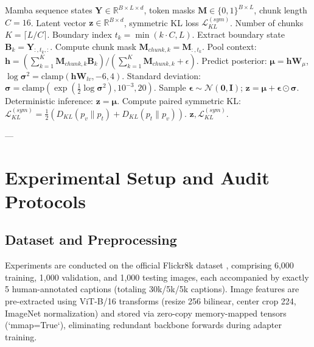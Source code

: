 \documentclass[journal]{IEEEtran}
\begin{document}
\begin{algorithm}[t]
\caption{Boundary-State Extraction and HVSC Compression}
\label{alg:hvsc_compression}
\begin{algorithmic}[1]
\REQUIRE Mamba sequence states $\mathbf{Y} \in \mathbb{R}^{B \times L \times d}$, token masks $\mathbf{M} \in \{0, 1\}^{B \times L}$, chunk length $C=16$.
\ENSURE Latent vector $\mathbf{z} \in \mathbb{R}^{B \times d}$, symmetric KL loss $\mathcal{L}_{KL}^{(sym)}$.
\STATE Number of chunks $K = \lceil L / C \rceil$.
    \STATE Boundary index $t_k = \min(k \cdot C, L)$.
    \STATE Extract boundary state $\mathbf{B}_k = \mathbf{Y}_{:, t_k, :}$.
    \STATE Compute chunk mask $\mathbf{M}_{chunk, k} = \mathbf{M}_{:, t_k}$.
\ENDFOR
\STATE Pool context: $\mathbf{h} = (\sum_{k=1}^K \mathbf{M}_{chunk, k} \mathbf{B}_k) / (\sum_{k=1}^K \mathbf{M}_{chunk, k} + \epsilon)$.
\STATE Predict posterior: $\boldsymbol{\mu} = \mathbf{h} \mathbf{W}_\mu$, $\log \boldsymbol{\sigma}^2 = \text{clamp}(\mathbf{h} \mathbf{W}_{lv}, -6, 4)$.
\STATE Standard deviation: $\boldsymbol{\sigma} = \text{clamp}(\exp(\frac{1}{2} \log \boldsymbol{\sigma}^2), 10^{-3}, 20)$.
    \STATE Sample $\boldsymbol{\epsilon} \sim \mathcal{N}(\mathbf{0}, \mathbf{I})$; $\mathbf{z} = \boldsymbol{\mu} + \boldsymbol{\epsilon} \odot \boldsymbol{\sigma}$.
\ELSE
    \STATE Deterministic inference: $\mathbf{z} = \boldsymbol{\mu}$.
\ENDIF
\STATE Compute paired symmetric KL: $\mathcal{L}_{KL}^{(sym)} = \frac{1}{2}(D_{KL}(p_v \parallel p_t) + D_{KL}(p_t \parallel p_v))$.
\RETURN $\mathbf{z}, \mathcal{L}_{KL}^{(sym)}$.
\end{algorithmic}
\end{algorithm}

---

\section{Experimental Setup and Audit Protocols}

\subsection{Dataset and Preprocessing}
Experiments are conducted on the official Flickr8k dataset \cite{hodosh2013framing}, comprising 6,000 training, 1,000 validation, and 1,000 testing images, each accompanied by exactly 5 human-annotated captions (totaling 30k/5k/5k captions). Image features are pre-extracted using ViT-B/16 transforms (resize 256 bilinear, center crop 224, ImageNet normalization) and stored via zero-copy memory-mapped tensors (`mmap=True`), eliminating redundant backbone forwards during adapter training.
\end{document}
